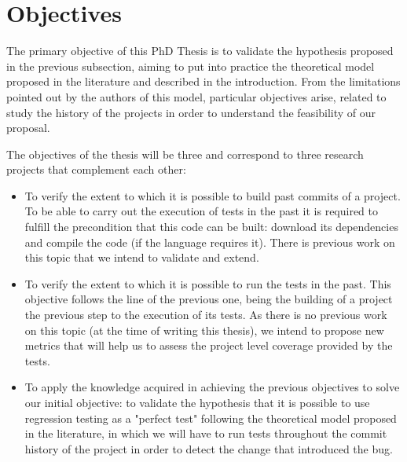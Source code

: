 \section{Objectives}

The primary objective of this PhD Thesis is to validate the hypothesis proposed in the previous subsection, aiming to put into practice the theoretical model proposed in the literature and described in the introduction. 
From the limitations pointed out by the authors of this model, particular objectives arise, related to study the history of the projects in order to understand the feasibility of our proposal.

The objectives of the thesis will be three and correspond to three research projects that complement each other:

\begin{itemize}
    \item To verify the extent to which it is possible to build past commits of a project. To be able to carry out the execution of tests in the past it is required to fulfill the precondition that this code can be built: download its dependencies and compile the code  (if the language requires it). There is previous work on this topic that we intend to validate and extend.
    \item To verify the extent to which it is possible to run the tests in the past. This objective follows the line of the previous one, being the building of a project the previous step to the execution of its tests. As there is no previous work on this topic (at the time of writing this thesis), we intend to propose new metrics that will help us to assess the project level coverage provided by the tests.
    \item To apply the knowledge acquired in achieving the previous objectives to solve our initial objective: to validate the hypothesis that it is possible to use regression testing as a "perfect test" following the theoretical model proposed in the literature, in which we will have to run tests throughout the commit history of the project in order to detect the change that introduced the bug. 
\end{itemize}


